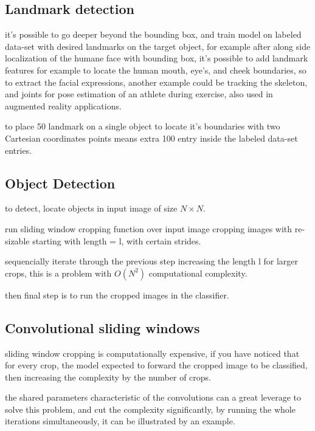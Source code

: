 \documentclass[4apaper,12pt]{book}
\begin{document}
\begin{description}
      \subsection{Landmark detection}
      \begin{description}
      \item it's possible to go deeper beyond the bounding box, and train model on labeled data-set with desired landmarks on the target object, for example after along side localization of the humane face with bounding box, it's possible to add landmark features for example to locate the human mouth, eye's, and cheek boundaries, so to extract the facial expressions, another example could be tracking the skeleton, and joints for pose estimation of an athlete during exercise, also used in augmented reality applications.
      \item to place 50 landmark on a single object to locate it's boundaries with two Cartesian coordinates points means extra 100 entry inside the labeled data-set entries.
      \end{description}
      \subsection{Object Detection}
      \begin{description}
      \item to detect, locate objects in input image of size $N\times{N}$.
      \item run sliding window cropping function over input image cropping images with re-sizable starting with length = l, with certain strides.
      \item sequencially iterate through the previous step increasing the length l for larger crops, this is a problem with $O(N^2)$ computational complexity.
      \item then final step is to run the cropped images in the classifier.
        \subsection{Convolutional sliding windows}
        \begin{description}
        \item sliding window cropping is computationally expensive, if you have noticed that for every crop, the model expected to forward the cropped image to be classified, then increasing the complexity by the number of crops.
        \item the shared parameters characteristic of the convolutions can a great leverage to solve this problem, and cut the complexity significantly, by running the whole iterations simultaneously, it can be illustrated by an example.

\end{description}
\end{description}
\end{description}
\end{document}
